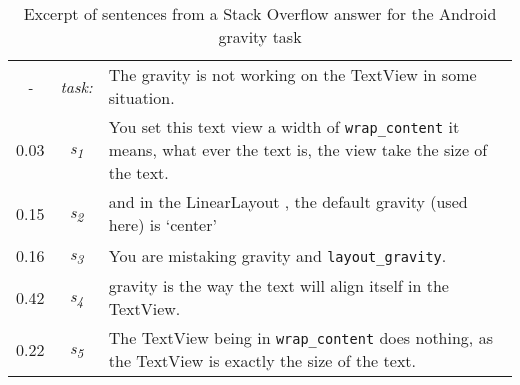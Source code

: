 \vspace{4mm}        
\begin{table}[H]
\begin{scriptsize}
\begin{tabular}{ccl}

\hline

\textit{-} & \textit{task:}  & \parbox[l][.5cm][c]{11cm}{ The gravity is not working on the TextView in some situation. } \\

0.03 & \textit{s\textsubscript{1}} &  \parbox[l][1cm][c] {10cm}{ You set this text view a width of \texttt{wrap\_content} it means, what ever the text is, the view take the size of the text. }\\
0.15 & \textit{s\textsubscript{2}} &  \parbox[l][.5cm][c]{10cm}{  and in the LinearLayout , the default gravity (used here) is `center' }\\
0.16 & \textit{s\textsubscript{3}} &  \parbox[l][.5cm][c]{10cm}{ You are mistaking gravity and \texttt{layout\_gravity}.}\\
0.42 & \textit{s\textsubscript{4}} &  \parbox[l][.5cm][c]{10cm}{ gravity is the way the text will align itself in the TextView. }\\
0.22 & \textit{s\textsubscript{5}} &  \parbox[l][1cm][c]{10cm}{ The TextView being in \texttt{wrap\_content} does nothing, as the TextView is exactly the size of the text. }\\


\hline

\end{tabular}
\end{scriptsize}
\caption{Excerpt of sentences from a Stack Overflow answer for the Android gravity task}
\label{tbl:gravity-task}
\end{table}





